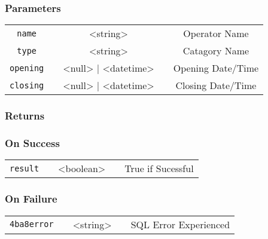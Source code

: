 \documentclass[a4paper,12pt]{article}
\begin{document}
\subsubsection{Parameters}

\begin{tabular}{ccccc}
\verb!name! & \vspace{15mm} & <string> & \vspace{15mm} & Operator Name \\
\verb!type! & \vspace{15mm} & <string> & \vspace{15mm} & Catagory Name \\
\verb!opening! & \vspace{15mm} & <null> | <datetime> & \vspace{15mm} & Opening Date/Time \\
\verb!closing! & \vspace{15mm} & <null> | <datetime> & \vspace{15mm} & Closing Date/Time \\
\end{tabular}

\subsubsection{Returns}

\subsubsection{On Success}

\begin{tabular}{ccccc}
\verb!result! & \vspace{15mm} & <boolean> & \vspace{15mm} & True if Sucessful \\
\end{tabular}

\subsubsection{On Failure}

\begin{tabular}{ccccc}
\verb!4ba8error! & \vspace{15mm} & <string> & \vspace{15mm} & SQL Error Experienced \\
\end{tabular}
\end{document}
